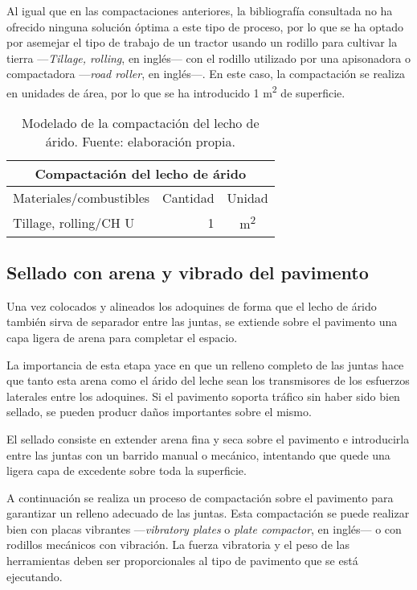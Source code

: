 Al igual que en las compactaciones anteriores, la bibliografía consultada no ha ofrecido ninguna solución óptima a este tipo de proceso, por lo que se ha optado por asemejar el tipo de trabajo de un tractor usando un rodillo para cultivar la tierra —\textit{Tillage, rolling}, en inglés— con el rodillo utilizado por una apisonadora o compactadora —\textit{road roller}, en inglés—. En este caso, la compactación se realiza en unidades de área, por lo que se ha introducido 1 \si{m^2} de superficie.

\begin{table}[!htb]
\centering
\begin{tabular}{p{8cm}rc}
\toprule
\multicolumn{3}{c}{Compactación del lecho de árido}\\
\midrule
Materiales/combustibles & Cantidad & Unidad\\
\midrule
Tillage, rolling/CH U & 1 & \si{m^2}\\
\bottomrule
\end{tabular}
\caption[Modelado de la compactación del lecho de árido.]{Modelado de la compactación del lecho de árido. Fuente: elaboración propia.}
\label{modeladolecho}
\end{table}

\subsection{Sellado con arena y vibrado del pavimento}\label{sec:selladoinstalacion}

Una vez colocados y alineados los adoquines de forma que el lecho de árido también sirva de separador entre las juntas, se extiende sobre el pavimento una capa ligera de arena para completar el espacio.

La importancia de esta etapa yace en que un relleno completo de las juntas hace que tanto esta arena como el árido del leche sean los transmisores de los esfuerzos laterales entre los adoquines. Si el pavimento soporta tráfico sin haber sido bien sellado, se pueden producr daños importantes sobre el mismo.

El sellado consiste en extender arena fina y seca sobre el pavimento e introducirla entre las juntas con un barrido manual o mecánico, intentando que quede una ligera capa de excedente sobre toda la superficie.

A continuación se realiza un proceso de compactación sobre el pavimento para garantizar un relleno adecuado de las juntas. Esta compactación se puede realizar bien con placas vibrantes —\textit{vibratory plates} o \textit{plate compactor}, en inglés— o con rodillos mecánicos con vibración. La fuerza vibratoria y el peso de las herramientas deben ser proporcionales al tipo de pavimento que se está ejecutando.

